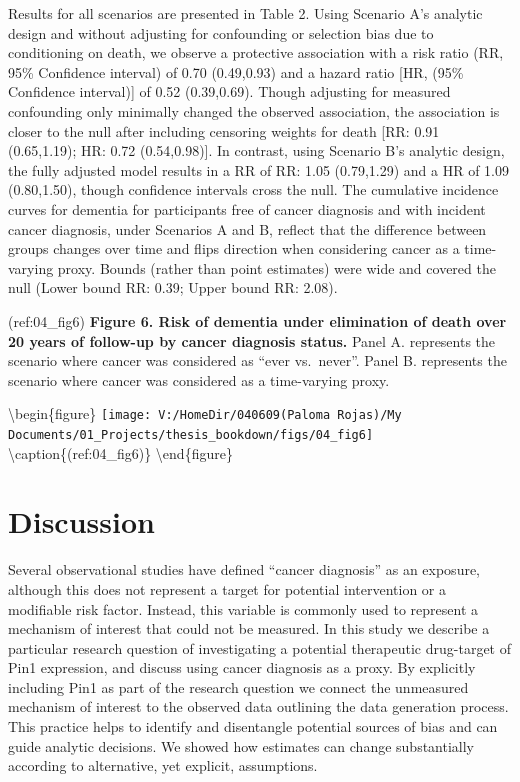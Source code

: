 \documentclass[
]{book}
\begin{document}
Results for all scenarios are presented in Table 2. Using Scenario A's analytic design and without adjusting for confounding or selection bias due to conditioning on death, we observe a protective association with a risk ratio (RR, 95\% Confidence interval) of 0.70 (0.49,0.93) and a hazard ratio {[}HR, (95\% Confidence interval){]} of 0.52 (0.39,0.69). Though adjusting for measured confounding only minimally changed the observed association, the association is closer to the null after including censoring weights for death {[}RR: 0.91 (0.65,1.19); HR: 0.72 (0.54,0.98){]}. In contrast, using Scenario B's analytic design, the fully adjusted model results in a RR of RR: 1.05 (0.79,1.29) and a HR of 1.09 (0.80,1.50), though confidence intervals cross the null. The cumulative incidence curves for dementia for participants free of cancer diagnosis and with incident cancer diagnosis, under Scenarios A and B, reflect that the difference between groups changes over time and flips direction when considering cancer as a time-varying proxy. Bounds (rather than point estimates) were wide and covered the null (Lower bound RR: 0.39; Upper bound RR: 2.08).

(ref:04\_fig6) \textbf{Figure 6. Risk of dementia under elimination of death over 20 years of follow-up by cancer diagnosis status.} Panel A. represents the scenario where cancer was considered as ``ever vs.~never''. Panel B. represents the scenario where cancer was considered as a time-varying proxy.

\textbackslash begin\{figure\}
\texttt{[image: V:/HomeDir/040609(Paloma Rojas)/My Documents/01\_Projects/thesis\_bookdown/figs/04\_fig6]} \textbackslash caption\{(ref:04\_fig6)\}\label{fig:unnamed-chunk-6}
\textbackslash end\{figure\}

\hypertarget{discussion-2}{%
\section{Discussion}\label{discussion-2}}

Several observational studies have defined ``cancer diagnosis'' as an exposure, although this does not represent a target for potential intervention or a modifiable risk factor. Instead, this variable is commonly used to represent a mechanism of interest that could not be measured. In this study we describe a particular research question of investigating a potential therapeutic drug-target of Pin1 expression, and discuss using cancer diagnosis as a proxy. By explicitly including Pin1 as part of the research question we connect the unmeasured mechanism of interest to the observed data outlining the data generation process. This practice helps to identify and disentangle potential sources of bias and can guide analytic decisions. We showed how estimates can change substantially according to alternative, yet explicit, assumptions.
\end{document}
